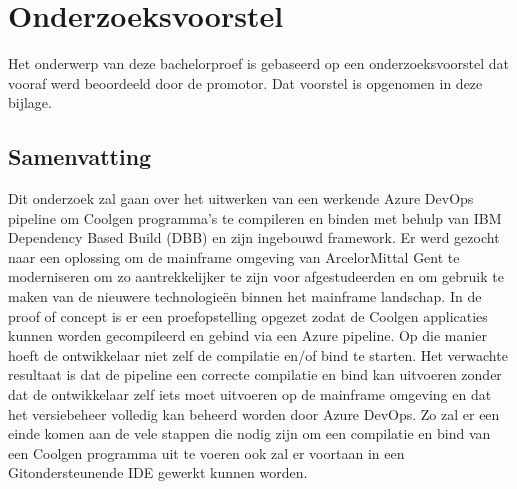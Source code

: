 \documentclass[dutch,dit,thesis]{hogentreport}
\begin{document}






%




\appendix

\chapter{Onderzoeksvoorstel}

Het onderwerp van deze bachelorproef is gebaseerd op een onderzoeksvoorstel dat vooraf werd beoordeeld door de promotor. Dat voorstel is opgenomen in deze bijlage.

\section*{Samenvatting}

Dit onderzoek zal gaan over het uitwerken van een werkende Azure DevOps pipeline om Coolgen programma’s te compileren en binden met behulp van IBM Dependency Based Build (DBB) en zijn ingebouwd framework. Er werd gezocht naar een oplossing om de mainframe omgeving van ArcelorMittal Gent te moderniseren om zo aantrekkelijker te zijn voor afgestudeerden en om gebruik te maken van de nieuwere technologieën binnen het mainframe landschap. In de proof of concept is er een proefopstelling opgezet zodat de Coolgen applicaties kunnen worden gecompileerd en gebind via een Azure pipeline. Op die manier hoeft de ontwikkelaar niet zelf de compilatie en/of bind te starten. Het verwachte resultaat is dat de pipeline een correcte compilatie en bind kan uitvoeren zonder dat de ontwikkelaar zelf iets moet uitvoeren op de mainframe omgeving en dat het versiebeheer volledig kan beheerd worden door Azure DevOps. Zo zal er een einde komen aan de vele stappen die nodig zijn om een compilatie en bind van een Coolgen programma uit te voeren ook zal er voortaan in een Gitondersteunende IDE gewerkt kunnen worden.


\end{document}
